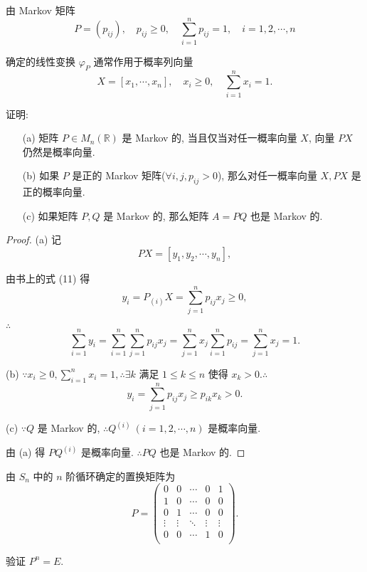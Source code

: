 \documentclass[color=black,device=normal,lang=cn,mode=geye]{elegantnote}
\begin{document}
\begin{exercise}%
    由 Markov 矩阵
    \[P=(p_{ij}),\quad p_{ij}\geq0,\quad\sum\limits_{i=1}^np_{ij}=1,\quad i=1,2,\cdots,n\]
    
    确定的线性变换 $\varphi_P$ 通常作用于概率列向量
    \[X=[x_1,\cdots,x_n],\quad x_i\geq0,\quad\sum\limits_{i=1}^nx_i=1.\]
    
    证明:
    \begin{itemize}
        \item[(a)] 矩阵 $P\in M_n(\mathbb{R})$ 是 Markov 的, 当且仅当对任一概率向量 $X$, 向量 $PX$ 仍然是概率向量.
        \item[(b)] 如果 $P$ 是正的 Markov 矩阵($\forall i,j,p_{ij}>0$), 那么对任一概率向量 $X,PX$ 是正的概率向量.
        \item[(c)] 如果矩阵 $P,Q$ 是 Markov 的, 那么矩阵 $A=PQ$ 也是 Markov 的.
    \end{itemize}
\end{exercise}
\begin{proof}
    (a) 记
    \[PX=[y_1,y_2,\cdots,y_n],\]

    由书上的式 (11) 得
    \[y_i=P_{(i)}X=\sum\limits_{j=1}^np_{ij}x_{j}\geq0,\]

    $\therefore$
    \[\sum\limits_{i=1}^ny_i=\sum\limits_{i=1}^n\sum\limits_{j=1}^np_{ij}x_{j}=\sum\limits_{j=1}^nx_{j}\sum\limits_{i=1}^np_{ij}=\sum\limits_{j=1}^nx_{j}=1.\]

    (b) $\because x_i\geq0,\sum\limits_{i=1}^nx_i=1,\therefore\exists k$ 满足 $1\leq k\leq n$ 使得 $x_k>0.\therefore$
    \[y_i=\sum\limits_{j=1}^np_{ij}x_{j}\geq p_{ik}x_k>0.\]

    (c) $\because Q$ 是 Markov 的, $\therefore Q^{(i)}\ (i=1,2,\cdots,n)$ 是概率向量.

    由 (a) 得 $PQ^{(i)}$ 是概率向量. $\therefore PQ$ 也是 Markov 的.
\end{proof}
\begin{exercise}%
    由 $S_n$ 中的 $n$ 阶循环确定的置换矩阵为
    \[P=\begin{pmatrix}
        0 & 0 & \cdots & 0 & 1 \\
        1 & 0 & \cdots & 0 & 0 \\
        0 & 1 & \cdots & 0 & 0 \\
        \vdots & \vdots & \ddots & \vdots & \vdots \\
        0 & 0 & \cdots & 1 & 0 \\
    \end{pmatrix}.\]

    验证 $P^n=E$.
\end{exercise}
\end{document}

